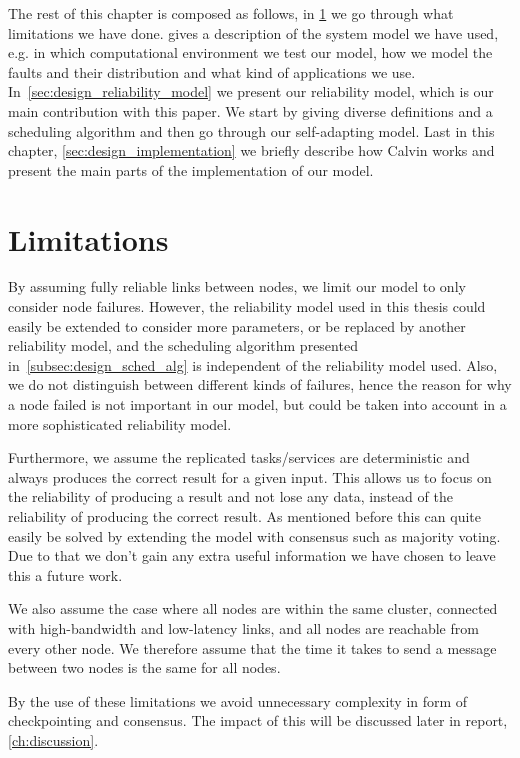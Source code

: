 \documentclass{cslthse-msc}
\begin{document}
The rest of this chapter is composed as follows, in \cref{sec:design_limitations} we go through what limitations we have done.  gives a description of the system model we have used, e.g. in which computational environment we test our model, how we model the faults and their distribution and what kind of applications we use. In~\cref{sec:design_reliability_model} we present our reliability model, which is our main contribution with this paper. We start by giving diverse definitions and a scheduling algorithm and then go through our self-adapting model. Last in this chapter, \cref{sec:design_implementation} we briefly describe how Calvin works and present the main parts of the implementation of our model.

\section{Limitations} \label{sec:design_limitations}
By assuming fully reliable links between nodes, we limit our model to only consider node failures. However, the reliability model used in this thesis could easily be extended to consider more parameters, or be replaced by another reliability model, and the scheduling algorithm presented in~\cref{subsec:design_sched_alg} is independent of the reliability model used. Also, we do not distinguish between different kinds of failures, hence the reason for why a node failed is not important in our model, but could be taken into account in a more sophisticated reliability model.

Furthermore, we assume the replicated tasks/services are deterministic and always produces the correct result for a given input. This allows us to focus on the reliability of producing a result and not lose any data, instead of the reliability of producing the correct result. As mentioned before this can quite easily be solved by extending the model with consensus such as majority voting. Due to that we don't gain any extra useful information we have chosen to leave this a future work.

We also assume the case where all nodes are within the same cluster, connected with high-bandwidth and low-latency links, and all nodes are reachable from every other node. We therefore assume that the time it takes to send a message between two nodes is the same for all nodes.

By the use of these limitations we avoid unnecessary complexity in form of checkpointing and consensus. The impact of this will be discussed later in report, \cref{ch:discussion}.
\end{document}
